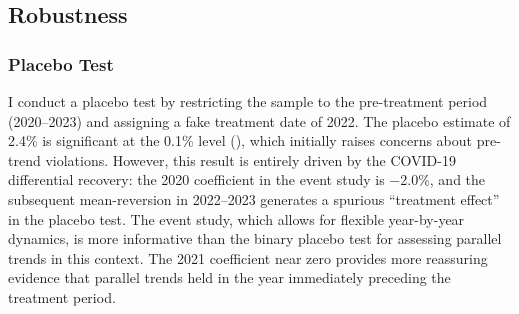 \documentclass[12pt]{article}
\begin{document}
\subsection{Robustness}

\subsubsection{Placebo Test}

I conduct a placebo test by restricting the sample to the pre-treatment period (2020--2023) and assigning a fake treatment date of 2022. The placebo estimate of 2.4\% is significant at the 0.1\% level (), which initially raises concerns about pre-trend violations. However, this result is entirely driven by the COVID-19 differential recovery: the 2020 coefficient in the event study is $-$2.0\%, and the subsequent mean-reversion in 2022--2023 generates a spurious ``treatment effect'' in the placebo test. The event study, which allows for flexible year-by-year dynamics, is more informative than the binary placebo test for assessing parallel trends in this context. The 2021 coefficient near zero provides more reassuring evidence that parallel trends held in the year immediately preceding the treatment period.
\end{document}
